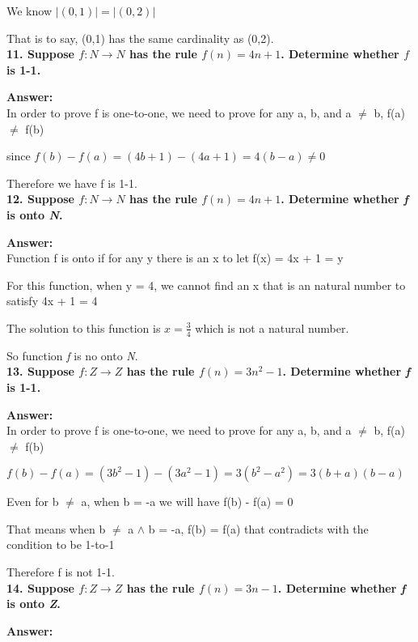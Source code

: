 \documentclass{article}
\begin{document}
\begin{large}
We know $|(0,1)| = |(0,2)|$

That is to say, (0,1) has the same cardinality as (0,2).\\


\textbf{11. Suppose $f:N\to N$ has the rule $f(n)=4n+1$. Determine whether $f$ is 1-1.}

\textbf{Answer:} \\

In order to prove f is one-to-one, we need to prove for any a, b, and a $\neq$ b, f(a) $\neq$ f(b)

since $f(b) - f(a) = (4b + 1) - (4a + 1) = 4(b-a) \neq 0$

Therefore we have f is 1-1.\\


\textbf{12. Suppose $f:N\to N$ has the rule $f(n)=4n+1$. Determine whether \emph{f} is onto \emph{N}.}

\textbf{Answer:} \\

Function f is onto if for any y there is an x to let f(x) = 4x + 1 = y

For this function, when y = 4, we cannot find an x that is an natural number to satisfy 4x + 1 = 4

The solution to this function is $x = \frac{3}{4}$ which is not a natural number.

So function \emph{f} is no onto \emph{N}.\\

\textbf{13. Suppose $f:Z\to Z$ has the rule $f(n)=3{n^{2}}-1$. Determine whether \emph{f} is 1-1.}

\textbf{Answer:} \\

In order to prove f is one-to-one, we need to prove for any a, b, and a $\neq$ b, f(a) $\neq$ f(b)

$f(b) - f(a) = (3b^2 - 1) - (3a^2 - 1) = 3(b^2 - a^2) = 3(b + a)(b - a)$

Even for b $\neq$ a, when b = -a we will have f(b) - f(a) = 0

That means when b $\neq$ a $\land$ b = -a, f(b) = f(a) that contradicts with the condition to be 1-to-1

Therefore f is not 1-1.\\


\textbf{14. Suppose $f:Z\to Z$ has the rule $f(n)=3n-1$. Determine whether \emph{f} is onto \emph{Z}.}

\textbf{Answer:} \\


\end{large}
\end{document}
